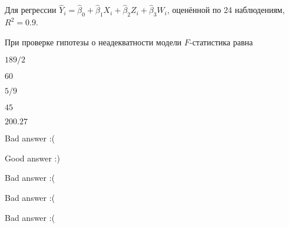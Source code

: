
\begin{question}
Для регрессии \(\hat Y_i = \hat\beta_0 + \hat\beta_1 X_i + \hat\beta_2 Z_i + \hat\beta_3 W_i\), оценённой по 24 наблюдениям, \(R^2=0.9\).

При проверке гипотезы о неадекватности модели \(F\)-статистика равна
\begin{answerlist}
  \item \(189/2\)
  \item \(60\)
  \item \(5/9\)
  \item \(45\)
  \item \(200.27\)
\end{answerlist}
\end{question}

\begin{solution}
\begin{answerlist}
  \item Bad answer :(
  \item Good answer :)
  \item Bad answer :(
  \item Bad answer :(
  \item Bad answer :(
\end{answerlist}
\end{solution}

